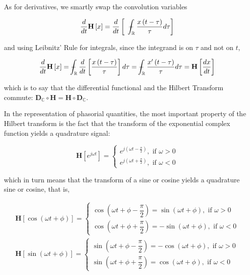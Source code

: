 	As for derivatives, we smartly swap the convolution variables

\begin{equation} \dfrac{d}{dt}\mathbf{H}\left[x\right] = \dfrac{d}{dt} \left[\hspace{2mm}\dashint_{\mathbb{R}} \dfrac{x\left(t-\tau\right)}{\tau} d\tau \right] \end{equation}

	\noindent and using Leibnitz' Rule for integrals, since the integrand is on $\tau$ and not on $t$,

\begin{equation} \dfrac{d}{dt}\mathbf{H}\left[x\right] = \dashint_{\mathbb{R}} \dfrac{d}{dt} \left[\dfrac{x\left(t-\tau\right)}{\tau} \right]d\tau =  \dashint_{\mathbb{R}} \dfrac{x'\left(t-\tau\right)}{\tau} d\tau = \mathbf{H}\left[\dfrac{dx}{dt}\right] \label{eq:hilvert_diff}\end{equation}

	\noindent which is to say that the differential functional and the Hilbert Transform commute: $\mathbf{D}_\mathbb{C}\circ\mathbf{H} = \mathbf{H}\circ\mathbf{D}_\mathbb{C}$.

	In the representation of phasorial quantities, the most important property of the Hilbert transform is the fact that the transform of the exponential complex function yields a quadrature signal:

\begin{equation}
	 \mathbf{H}\left[e^{j\omega t} \right] = \left\{\begin{array}{l} e^{j\left(\omega t - \frac{\pi}{2}\right)}, \text{ if } \omega > 0 \\[5mm] e^{j\left(\omega t + \frac{\pi}{2}\right) } , \text{ if } \omega < 0 \end{array}\right.
\end{equation}


	\noindent which in turn means that the transform of a sine or cosine yields a quadrature sine or cosine, that is,

\begin{gather}
	 \mathbf{H}\left[\cos\left(\omega t + \phi\right)\right] = \left\{\begin{array}{l} \cos\left(\omega t + \phi - \dfrac{\pi}{2} \right) = \sin\left(\omega t + \phi\right), \text{ if } \omega > 0 \\[5mm] \cos\left(\omega t + \phi + \dfrac{\pi}{2} \right) = -\sin\left(\omega t + \phi\right), \text{ if } \omega < 0 \end{array}\right. \\[10mm]
%
	 \mathbf{H}\left[\sin\left(\omega t + \phi\right)\right] = \left\{\begin{array}{l} \sin\left(\omega t + \phi - \dfrac{\pi}{2} \right) = -\cos\left(\omega t + \phi\right), \text{ if } \omega > 0 \\[5mm] \sin\left(\omega t + \phi + \dfrac{\pi}{2} \right) = \cos\left(\omega t + \phi\right), \text{ if } \omega < 0  \end{array}\right.
\end{gather}


